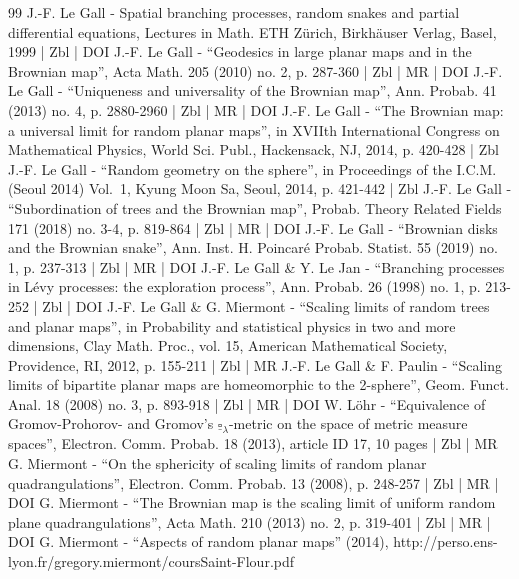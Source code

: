 \begin{thebibliography}{99}
J.-F. Le Gall - Spatial branching processes, random snakes and partial differential equations, Lectures in Math. ETH Zürich, Birkhäuser Verlag, Basel, 1999 | Zbl | DOI
J.-F. Le Gall - “Geodesics in large planar maps and in the Brownian map”, Acta Math. 205 (2010) no. 2, p. 287-360 | Zbl | MR | DOI
J.-F. Le Gall - “Uniqueness and universality of the Brownian map”, Ann. Probab. 41 (2013) no. 4, p. 2880-2960 | Zbl | MR | DOI
J.-F. Le Gall - “The Brownian map: a universal limit for random planar maps”, in XVIIth International Congress on Mathematical Physics, World Sci. Publ., Hackensack, NJ, 2014, p. 420-428 | Zbl
J.-F. Le Gall - “Random geometry on the sphere”, in Proceedings of the I.C.M. (Seoul 2014) Vol. 1, Kyung Moon Sa, Seoul, 2014, p. 421-442 | Zbl
J.-F. Le Gall - “Subordination of trees and the Brownian map”, Probab. Theory Related Fields 171 (2018) no. 3-4, p. 819-864 | Zbl | MR | DOI
J.-F. Le Gall - “Brownian disks and the Brownian snake”, Ann. Inst. H. Poincaré Probab. Statist. 55 (2019) no. 1, p. 237-313 | Zbl | MR | DOI
J.-F. Le Gall \& Y. Le Jan - “Branching processes in Lévy processes: the exploration process”, Ann. Probab. 26 (1998) no. 1, p. 213-252 | Zbl | DOI
J.-F. Le Gall \& G. Miermont - “Scaling limits of random trees and planar maps”, in Probability and statistical physics in two and more dimensions, Clay Math. Proc., vol. 15, American Mathematical Society, Providence, RI, 2012, p. 155-211 | Zbl | MR
J.-F. Le Gall \& F. Paulin - “Scaling limits of bipartite planar maps are homeomorphic to the 2-sphere”, Geom. Funct. Anal. 18 (2008) no. 3, p. 893-918 | Zbl | MR | DOI
W. Löhr - “Equivalence of Gromov-Prohorov- and Gromov’s $\underline{\square }_\lambda $-metric on the space of metric measure spaces”, Electron. Comm. Probab. 18 (2013), article ID 17, 10 pages | Zbl | MR
G. Miermont - “On the sphericity of scaling limits of random planar quadrangulations”, Electron. Comm. Probab. 13 (2008), p. 248-257 | Zbl | MR | DOI
G. Miermont - “The Brownian map is the scaling limit of uniform random plane quadrangulations”, Acta Math. 210 (2013) no. 2, p. 319-401 | Zbl | MR | DOI
G. Miermont - “Aspects of random planar maps” (2014), http://perso.ens-lyon.fr/gregory.miermont/coursSaint-Flour.pdf

\end{thebibliography}
